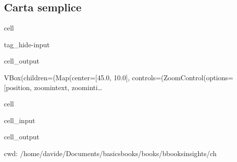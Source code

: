 \documentclass[letterpaper,10pt,italian]{jupyterBook}
\begin{document}
\subsection{Carta semplice}
\label{\detokenize{ch/history-test:carta-semplice}}
\begin{sphinxuseclass}{cell}
\begin{sphinxuseclass}{tag_hide-input}\begin{sphinxVerbatimOutput}

\begin{sphinxuseclass}{cell_output}
\begin{sphinxVerbatim}[commandchars=\\\{\}]
VBox(children=(Map(center=[45.0, 10.0], controls=(ZoomControl(options=[\PYGZsq{}position\PYGZsq{}, \PYGZsq{}zoom\PYGZus{}in\PYGZus{}text\PYGZsq{}, \PYGZsq{}zoom\PYGZus{}in\PYGZus{}ti…
\end{sphinxVerbatim}

\end{sphinxuseclass}\end{sphinxVerbatimOutput}

\end{sphinxuseclass}
\end{sphinxuseclass}
\begin{sphinxuseclass}{cell}\begin{sphinxVerbatimInput}

\begin{sphinxuseclass}{cell_input}
\begin{sphinxVerbatim}[commandchars=\\\{\}]
 
\end{sphinxVerbatim}

\end{sphinxuseclass}\end{sphinxVerbatimInput}
\begin{sphinxVerbatimOutput}

\begin{sphinxuseclass}{cell_output}
\begin{sphinxVerbatim}[commandchars=\\\{\}]
cwd: /home/davide/Documents/basics\PYGZhy{}books/books/bbooks\PYGZhy{}insights/ch
\end{sphinxVerbatim}

\end{sphinxuseclass}\end{sphinxVerbatimOutput}

\end{sphinxuseclass}
\end{document}
